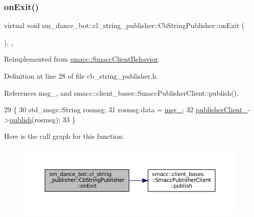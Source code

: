 \subsubsection{\texorpdfstring{on\+Exit()}{onExit()}}
{\footnotesize\ttfamily virtual void sm\+\_\+dance\+\_\+bot\+::cl\+\_\+string\+\_\+publisher\+::\+Cb\+String\+Publisher\+::on\+Exit (\begin{DoxyParamCaption}{ }\end{DoxyParamCaption})\hspace{0.3cm}{\ttfamily [inline]}, {\ttfamily [override]}, {\ttfamily [virtual]}}



Reimplemented from \hyperlink{classsmacc_1_1SmaccClientBehavior_ac0cd72d42bd00425362a97c9803ecce5}{smacc\+::\+Smacc\+Client\+Behavior}.



Definition at line 28 of file cb\+\_\+string\+\_\+publisher.\+h.



References msg\+\_\+, and smacc\+::client\+\_\+bases\+::\+Smacc\+Publisher\+Client\+::publish().


\begin{DoxyCode}
29     \{
30         std\_msgs::String rosmsg;
31         rosmsg.data = \hyperlink{classsm__dance__bot_1_1cl__string__publisher_1_1CbStringPublisher_a320ff6940dc15b469af3679d2d2eb655}{msg\_};
32         \hyperlink{classsm__dance__bot_1_1cl__string__publisher_1_1CbStringPublisher_aafcad6e6296a3088cb91ffeb22025bd6}{publisherClient\_}->\hyperlink{classsmacc_1_1client__bases_1_1SmaccPublisherClient_a083abb0f5c0f587f3381a58fe1fe3669}{publish}(rosmsg);
33     \}
\end{DoxyCode}
Here is the call graph for this function\+:
\nopagebreak
\begin{figure}[H]
\begin{center}
\leavevmode
\includegraphics[width=350pt]{classsm__dance__bot_1_1cl__string__publisher_1_1CbStringPublisher_ac93cc1eb150140331cb3e560ec8249e2_cgraph}
\end{center}
\end{figure}


